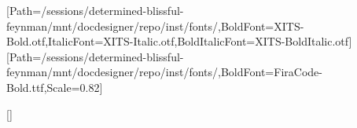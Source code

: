 \usepackage{fontspec}
\usepackage{anyfontsize}
\setmainfont{XITS-Regular.otf}[Path=/sessions/determined-blissful-feynman/mnt/docdesigner/repo/inst/fonts/,BoldFont=XITS-Bold.otf,ItalicFont=XITS-Italic.otf,BoldItalicFont=XITS-BoldItalic.otf]
\setmonofont{FiraCode-Regular.ttf}[Path=/sessions/determined-blissful-feynman/mnt/docdesigner/repo/inst/fonts/,BoldFont=FiraCode-Bold.ttf,Scale=0.82]
\usepackage{xcolor}
\color{text}
\usepackage[explicit]{titlesec}
[\vspace{2pt}{\color{rule}\titlerule[1pt]}]
\titlespacing*{\section}{0pt}{1.7em}{0.5em}
\titlespacing*{\subsection}{0pt}{1.1em}{0.3em}
\titlespacing*{\subsubsection}{0pt}{0.9em}{0.2em}
\usepackage{titling}
\pretitle{\begin{flushleft}\fontsize{26.0}{28.6}\selectfont\bfseries\color{accent}}
\posttitle{\par\end{flushleft}\vskip0.3em{\color{rule}\rule{\linewidth}{2pt}}\vskip0.4em}
\preauthor{\begin{flushleft}\large\color{muted}}
\postauthor{\end{flushleft}}
\predate{\begin{flushleft}\color{muted}}
\postdate{\end{flushleft}}
\usepackage{microtype}
\usepackage{booktabs}
\renewcommand{\arraystretch}{1.2}
\setlength{\parindent}{0pt}
\setlength{\parskip}{0.5em}
\linespread{1.3}
\usepackage{fancyhdr}\pagestyle{fancy}\fancyhf{}
\renewcommand{\headrulewidth}{0pt}\renewcommand{\footrulewidth}{0.4pt}
\fancyfoot[R]{\small\color{muted}\thepage}